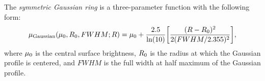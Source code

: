 \documentclass[preprint2]{emulateapj}
\begin{document}
The \emph{symmetric Gaussian ring} is a three-parameter function with the following form:
\begin{equation}
\mu_{\rm Gaussian}(\mu_{\rm 0},R_{\rm 0},FWHM;R) = \mu_{\rm 0} + \frac{2.5}{\ln(10)} 
\biggl[\frac{(R-R_{\rm 0})^2}{2(FWHM/2.355)^2} \biggr] ,
\end{equation}
where $\mu_{\rm 0}$ is the central surface brightness,
$R_{\rm 0}$ is the radius at which the Gaussian profile is centered, 
and $FWHM$ is the full width at half maximum of the Gaussian profile. \\






\clearpage
\end{document}

